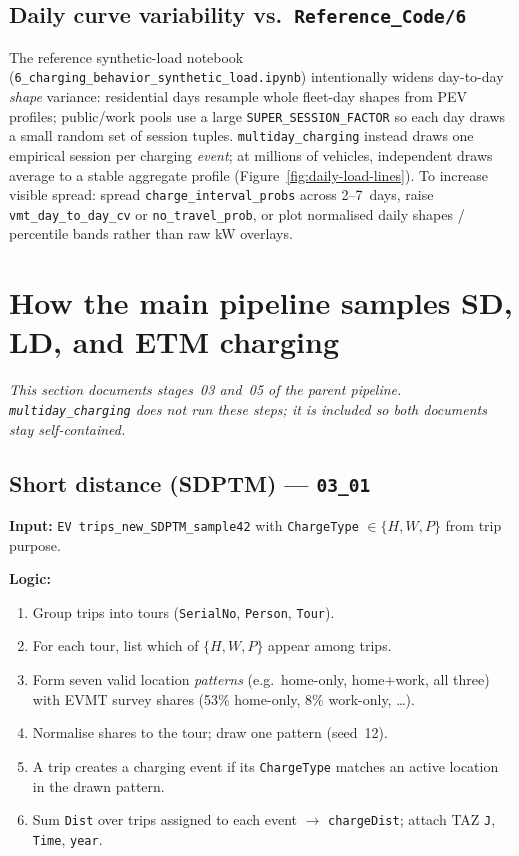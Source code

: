 \documentclass[11pt,a4paper]{article}
\begin{document}
\subsection{Daily curve variability vs.\ \texttt{Reference\_Code/6}}
The reference synthetic-load notebook (\texttt{6\_charging\_behavior\_synthetic\_load.ipynb}) intentionally widens day-to-day \emph{shape} variance: residential days resample whole fleet-day shapes from PEV profiles; public/work pools use a large \texttt{SUPER\_SESSION\_FACTOR} so each day draws a small random set of session tuples. \texttt{multiday\_charging} instead draws one empirical session per charging \emph{event}; at millions of vehicles, independent draws average to a stable aggregate profile (Figure~\ref{fig:daily-load-lines}). To increase visible spread: spread \texttt{charge\_interval\_probs} across 2--7~days, raise \texttt{vmt\_day\_to\_day\_cv} or \texttt{no\_travel\_prob}, or plot normalised daily shapes / percentile bands rather than raw kW overlays.

\section{How the main pipeline samples SD, LD, and ETM charging}

\textit{This section documents stages~03 and~05 of the parent pipeline. \texttt{multiday\_charging} does not run these steps; it is included so both documents stay self-contained.}

\subsection{Short distance (SDPTM) --- \texttt{03\_01}}
\textbf{Input:} \texttt{EV trips\_new\_SDPTM\_sample42} with \texttt{ChargeType} $\in \{H,W,P\}$ from trip purpose.

\textbf{Logic:}
\begin{enumerate}[noitemsep]
  \item Group trips into tours (\texttt{SerialNo}, \texttt{Person}, \texttt{Tour}).
  \item For each tour, list which of $\{H,W,P\}$ appear among trips.
  \item Form seven valid location \emph{patterns} (e.g.\ home-only, home+work, all three) with EVMT survey shares (53\% home-only, 8\% work-only, \ldots).
  \item Normalise shares to the tour; draw one pattern (seed~12).
  \item A trip creates a charging event if its \texttt{ChargeType} matches an active location in the drawn pattern.
  \item Sum \texttt{Dist} over trips assigned to each event $\rightarrow$ \texttt{chargeDist}; attach TAZ \texttt{J}, \texttt{Time}, \texttt{year}.
\end{enumerate}
\end{document}
